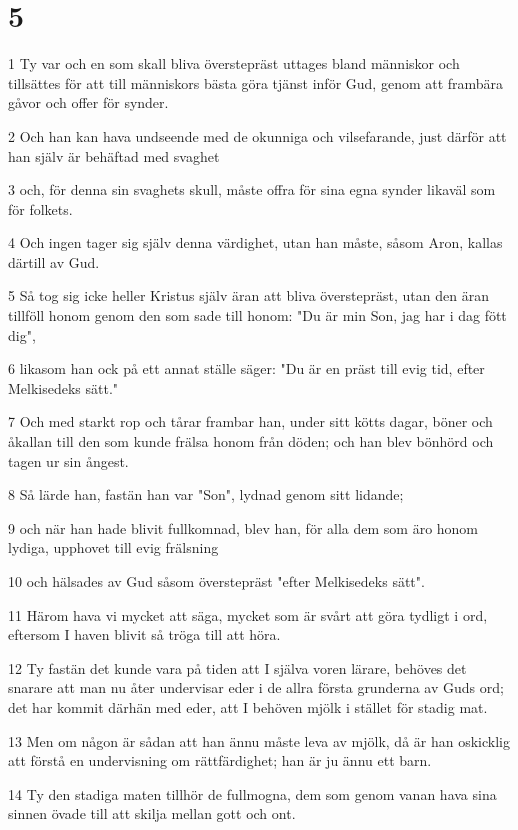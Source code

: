 \chapter{5}

\par 1 Ty var och en som skall bliva överstepräst uttages bland människor och tillsättes för att till människors bästa göra tjänst inför Gud, genom att frambära gåvor och offer för synder.
\par 2 Och han kan hava undseende med de okunniga och vilsefarande, just därför att han själv är behäftad med svaghet
\par 3 och, för denna sin svaghets skull, måste offra för sina egna synder likaväl som för folkets.
\par 4 Och ingen tager sig själv denna värdighet, utan han måste, såsom Aron, kallas därtill av Gud.
\par 5 Så tog sig icke heller Kristus själv äran att bliva överstepräst, utan den äran tillföll honom genom den som sade till honom: "Du är min Son, jag har i dag fött dig",
\par 6 likasom han ock på ett annat ställe säger: "Du är en präst till evig tid, efter Melkisedeks sätt."
\par 7 Och med starkt rop och tårar frambar han, under sitt kötts dagar, böner och åkallan till den som kunde frälsa honom från döden; och han blev bönhörd och tagen ur sin ångest.
\par 8 Så lärde han, fastän han var "Son", lydnad genom sitt lidande;
\par 9 och när han hade blivit fullkomnad, blev han, för alla dem som äro honom lydiga, upphovet till evig frälsning
\par 10 och hälsades av Gud såsom överstepräst "efter Melkisedeks sätt".
\par 11 Härom hava vi mycket att säga, mycket som är svårt att göra tydligt i ord, eftersom I haven blivit så tröga till att höra.
\par 12 Ty fastän det kunde vara på tiden att I själva voren lärare, behöves det snarare att man nu åter undervisar eder i de allra första grunderna av Guds ord; det har kommit därhän med eder, att I behöven mjölk i stället för stadig mat.
\par 13 Men om någon är sådan att han ännu måste leva av mjölk, då är han oskicklig att förstå en undervisning om rättfärdighet; han är ju ännu ett barn.
\par 14 Ty den stadiga maten tillhör de fullmogna, dem som genom vanan hava sina sinnen övade till att skilja mellan gott och ont.

